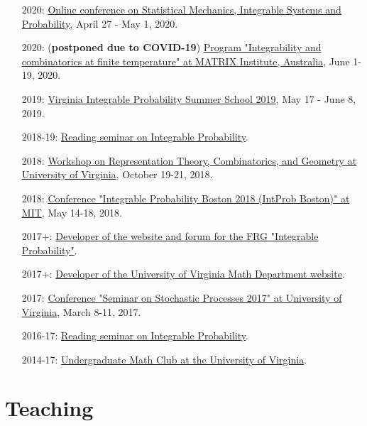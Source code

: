 \documentclass[letterpaper,11pt]{article}
\begin{document}
\begin{itemize}
\item [2020:]
\href{http://mtikhonov.com/smisp/}{Online conference on Statistical Mechanics, Integrable Systems and Probability},
April 27 - May 1, 2020.

\item [2020:]
(\textbf{postponed due to COVID-19})
\href{https://www.matrix-inst.org.au/events/integrability-and-combinatorics-at-finite-temperature/}{Program "Integrability and combinatorics at finite temperature" at MATRIX Institute, Australia},
June 1-19, 2020.

\item [2019:]
\href{http://vipss.int-prob.org/}{Virginia Integrable Probability Summer School 2019},
May 17 - June 8, 2019.

\item[2018-19:]
\href{https://lpetrov.cc/reading-2019/}{Reading seminar on Integrable Probability}.

\item [2018:]
\href{http://math.virginia.edu/ims/workshop-fall-2018/}{Workshop on Representation Theory, Combinatorics, and Geometry at University of Virginia},
October 19-21, 2018.

\item [2018:]
\href{http://frg.int-prob.org/conference2018/}{Conference "Integrable Probability Boston 2018 (IntProb Boston)" at MIT},
May 14-18, 2018.

\item [2017+:]
\href{http://frg.int-prob.org/}{Developer of the website and forum for the FRG "Integrable Probability"}.

\item [2017+:]
\href{http://math.virginia.edu/}{Developer of the University of Virginia Math Department website}.

\item [2017:]
\href{http://faculty.virginia.edu/ssp17/}{Conference "Seminar on Stochastic Processes 2017" at University of Virginia},
March 8-11, 2017.

\item [2016-17:]
\href{https://lpetrov.cc/2016/12/reading-seminar/}{Reading seminar on Integrable Probability}.

\item [2014-17:]
\href{http://math.virginia.edu/seminars/mathclub/}{Undergraduate Math Club at the University of Virginia}.

\end{itemize}


\section*{Teaching}
\end{document}
